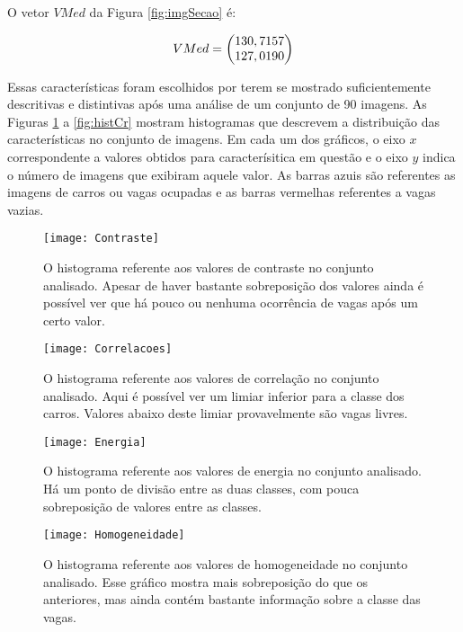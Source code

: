 O vetor $VMed$ da Figura \ref{fig:imgSecao} é:

\begin{equation}
\centering
\centering
	VMed = \begin{pmatrix}
	130,7157\\127,0190
	\end{pmatrix}
\centering
\centering
\label{eq:exemploCrominancia}
\end{equation}


Essas características foram escolhidos por terem se mostrado suficientemente descritivas e distintivas após uma análise de um conjunto de 90 imagens. As Figuras \ref{fig:histContraste} a \ref{fig:histCr} mostram histogramas que descrevem a distribuição das características no conjunto de imagens. Em cada um dos gráficos, o eixo $x$ correspondente a valores obtidos para caracterísitica em questão e o eixo $y$ indica o número de imagens que exibiram aquele valor. As barras azuis são referentes as imagens de carros ou vagas ocupadas e as barras vermelhas referentes a vagas vazias.

\begin{figure}
	\centering
	\texttt{[image: Contraste]}
	\caption{O histograma referente aos valores de contraste no conjunto analisado. Apesar de haver bastante sobreposição dos valores ainda é possível ver que há pouco ou nenhuma ocorrência de vagas após um certo valor.}
		\label{fig:histContraste}
	\centering
\end{figure}

\begin{figure}
	\centering
	\texttt{[image: Correlacoes]}
	\caption{O histograma referente aos valores de correlação no conjunto analisado. Aqui é possível ver um limiar inferior para a classe dos carros. Valores abaixo deste limiar provavelmente são vagas livres.}
		\label{fig:histCorrelacao}
	\centering
\end{figure}

\begin{figure}
	\centering
	\texttt{[image: Energia]}
	\caption{O histograma referente aos valores de energia no conjunto analisado. Há um ponto de divisão entre as duas classes, com pouca sobreposição de valores entre as classes.}
		\label{fig:histEnergia}
	\centering
\end{figure}

\begin{figure}
	\centering
	\texttt{[image: Homogeneidade]}
	\caption{O histograma referente aos valores de homogeneidade no conjunto analisado. Esse gráfico mostra mais sobreposição do que os anteriores, mas ainda contém bastante informação sobre a classe das vagas. }
	\label{fig:histHomo}
	\centering
\end{figure}

